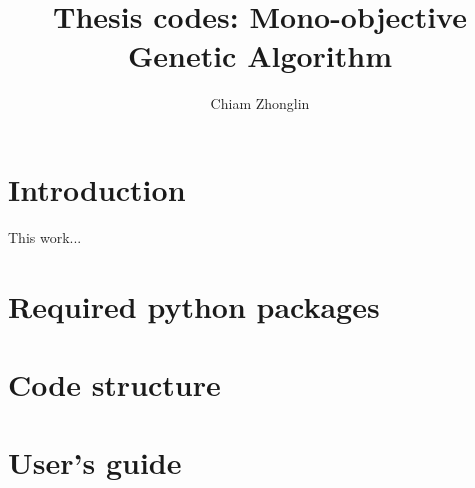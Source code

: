 \documentclass[a4paper]{article}
\begin{document}
\title{Thesis codes: Mono-objective Genetic Algorithm}
\author {Chiam Zhonglin}
\maketitle
\newpage

\tableofcontents

\clearpage

\section{Introduction}
This work...

\section{Required python packages}

\section{Code structure}

\section{User's guide}

\end{document}
